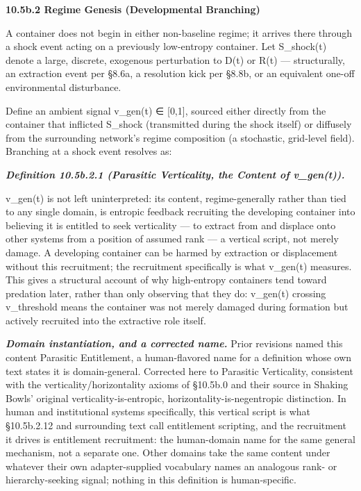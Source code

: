 \documentclass[
]{article}
\begin{document}
\textbf{10.5b.2 Regime Genesis (Developmental Branching)}

A container does not begin in either non-baseline regime; it arrives
there through a shock event acting on a previously low-entropy
container. Let S\_shock(t) denote a large, discrete, exogenous
perturbation to D(t) or R(t) --- structurally, an extraction event per
§8.6a, a resolution kick per §8.8b, or an equivalent one-off
environmental disturbance.

Define an ambient signal v\_gen(t) ∈ {[}0,1{]}, sourced either directly
from the container that inflicted S\_shock (transmitted during the shock
itself) or diffusely from the surrounding network's regime composition
(a stochastic, grid-level field). Branching at a shock event resolves
as:

\emph{\textbf{Definition 10.5b.2.1 (Parasitic Verticality, the Content
of v\_gen(t)).}}

v\_gen(t) is not left uninterpreted: its content, regime-generally
rather than tied to any single domain, is entropic feedback recruiting
the developing container into believing it is entitled to seek
verticality --- to extract from and displace onto other systems from a
position of assumed rank --- a vertical script, not merely damage. A
developing container can be harmed by extraction or displacement without
this recruitment; the recruitment specifically is what v\_gen(t)
measures. This gives a structural account of why high-entropy containers
tend toward predation later, rather than only observing that they do:
v\_gen(t) crossing v\_threshold means the container was not merely
damaged during formation but actively recruited into the extractive role
itself.

\emph{\textbf{Domain instantiation, and a corrected name.}} Prior
revisions named this content Parasitic Entitlement, a human-flavored
name for a definition whose own text states it is domain-general.
Corrected here to Parasitic Verticality, consistent with the
verticality/horizontality axioms of §10.5b.0 and their source in Shaking
Bowls' original verticality-is-entropic, horizontality-is-negentropic
distinction. In human and institutional systems specifically, this
vertical script is what §10.5b.2.12 and surrounding text call
entitlement scripting, and the recruitment it drives is entitlement
recruitment: the human-domain name for the same general mechanism, not a
separate one. Other domains take the same content under whatever their
own adapter-supplied vocabulary names an analogous rank- or
hierarchy-seeking signal; nothing in this definition is human-specific.
\end{document}
